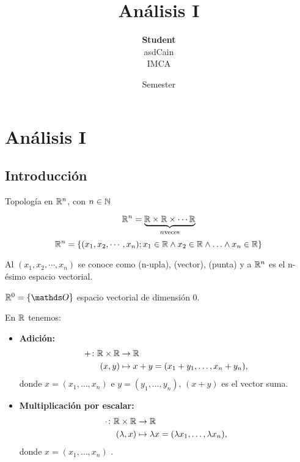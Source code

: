 \documentclass[oneside]{book}
\def\notetitle{Análisis I}
\def\noteauthor{
    \textbf{Student} \\ 
     asdCain\\
    IMCA}
\def\notedate{Semester}
\begin{document}
\title{\textbf{
    \LARGE{\notetitle} \vspace*{10\baselineskip}}
    }
\author{\noteauthor}
\date{\notedate}

\newpage

\newpage


\chapter{Análisis I}

\section{Introducción}

Topología en $\mathbb{R}^{n}$, con $n \in \mathbb{N}$

$$
\mathbb{R}^{n} =  \underbrace{\mathbb{R} \times \mathbb{R} \times \cdots \mathbb{R} }_{n \text{veces}}
$$
$$
\mathbb{R}^{n} = \{ (x_1, x_2, \cdots, x_n); x_1 \in \mathbb{R} \wedge  x_2 \in \mathbb{R} \wedge
 \ldots  \wedge  x_n \in \mathbb{R}       \}
$$

Al $(x_1, x_2, \cdots, x_n) $  se conoce como (n-upla), (vector), (punta) y a $\mathbb{R}^{n}$ es el n-ésimo espacio vectorial.

$\real{0} = \{\Ou\}$  espacio vectorial de dimensión $0$.

En $\mathbb{R}$ tenemos:

\begin{itemize}
    \item \textbf{Adición:}
    \begin{align*}
        +\colon \mathbb{R} \times \mathbb{R} &\to \mathbb{R} \\
        (x, y) &\mapsto x + y = (x_1 + y_1, \dots, x_n + y_n),
    \end{align*}
    donde $x = (x_1, \dots, x_n)$ e $y = (y_1, \dots, y_n)$, $(x+y)$ es el vector suma.

    \item \textbf{Multiplicación por escalar:}
    \begin{align*}
        \cdot\colon \mathbb{R} \times \mathbb{R} &\to \mathbb{R} \\
        (\lambda, x) &\mapsto \lambda x = (\lambda x_1, \dots, \lambda x_n),
    \end{align*}
    donde $x = (x_1, \dots, x_n)$ .
\end{itemize}
\end{document}
